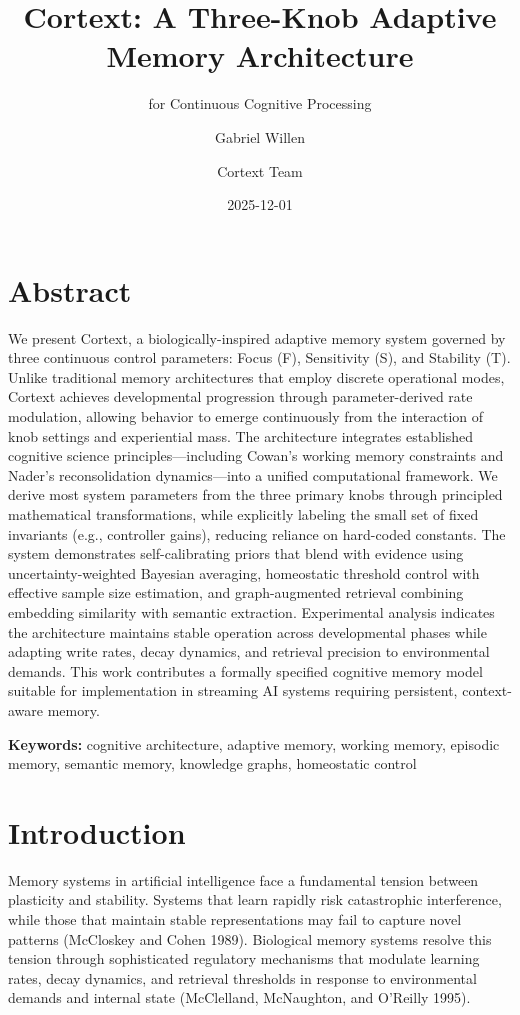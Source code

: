 \documentclass[
  letterpaper,
  DIV=11,
  numbers=noendperiod]{scrartcl}
\title{Cortext: A Three-Knob Adaptive Memory Architecture}
\subtitle{for Continuous Cognitive Processing}
\author{Gabriel Willen \and Cortext Team}
\date{2025-12-01}
\begin{document}
\maketitle


\section*{Abstract}\label{abstract}

We present Cortext, a biologically-inspired adaptive memory system
governed by three continuous control parameters: Focus (F), Sensitivity
(S), and Stability (T). Unlike traditional memory architectures that
employ discrete operational modes, Cortext achieves developmental
progression through parameter-derived rate modulation, allowing behavior
to emerge continuously from the interaction of knob settings and
experiential mass. The architecture integrates established cognitive
science principles---including Cowan's working memory constraints and
Nader's reconsolidation dynamics---into a unified computational
framework. We derive most system parameters from the three primary knobs
through principled mathematical transformations, while explicitly
labeling the small set of fixed invariants (e.g., controller gains),
reducing reliance on hard-coded constants. The system demonstrates
self-calibrating priors that blend with evidence using
uncertainty-weighted Bayesian averaging, homeostatic threshold control
with effective sample size estimation, and graph-augmented retrieval
combining embedding similarity with semantic extraction. Experimental
analysis indicates the architecture maintains stable operation across
developmental phases while adapting write rates, decay dynamics, and
retrieval precision to environmental demands. This work contributes a
formally specified cognitive memory model suitable for implementation in
streaming AI systems requiring persistent, context-aware memory.

\textbf{Keywords:} cognitive architecture, adaptive memory, working
memory, episodic memory, semantic memory, knowledge graphs, homeostatic
control

\section{Introduction}\label{introduction}

Memory systems in artificial intelligence face a fundamental tension
between plasticity and stability. Systems that learn rapidly risk
catastrophic interference, while those that maintain stable
representations may fail to capture novel patterns (McCloskey and Cohen
1989). Biological memory systems resolve this tension through
sophisticated regulatory mechanisms that modulate learning rates, decay
dynamics, and retrieval thresholds in response to environmental demands
and internal state (McClelland, McNaughton, and O'Reilly 1995).
\end{document}
